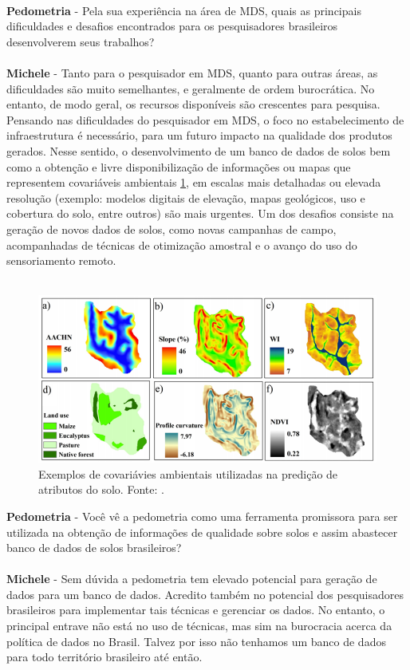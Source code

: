 \\
\textbf{Pedometria} - Pela sua experiência na área de MDS, quais as principais dificuldades e desafios encontrados para os pesquisadores brasileiros desenvolverem seus trabalhos?\\
\\
\textbf{Michele} - Tanto para o pesquisador em MDS, quanto para outras áreas, as dificuldades são muito semelhantes, e geralmente de ordem burocrática. No entanto, de modo geral, os recursos disponíveis são crescentes para pesquisa. Pensando nas dificuldades do pesquisador em MDS, o foco no estabelecimento de infraestrutura é necessário, para um futuro impacto na qualidade dos produtos gerados. Nesse sentido, o desenvolvimento de um banco de dados de solos bem como a obtenção e livre disponibilização de informações ou mapas que representem covariáveis ambientais \ref{figure:covar}, em escalas mais detalhadas ou elevada resolução (exemplo: modelos digitais de elevação, mapas geológicos, uso e cobertura do solo, entre outros) são mais urgentes. Um dos desafios consiste na geração de novos dados de solos, como novas campanhas de campo, acompanhadas de técnicas de otimização amostral e o avanço do uso do sensoriamento remoto.\\
\\
\begin{figure}[htbp]
\centering
\includegraphics[scale=0.8]{figuras/covariaveis-ambientais}
\caption{Exemplos de covariávies ambientais utilizadas na predição de atributos do solo. Fonte: \cite{Menezes:2011}.}
\label{figure:covar}
\end{figure}
\noindent \textbf{Pedometria} - Você vê a pedometria como uma ferramenta promissora para ser utilizada na obtenção de informações de qualidade sobre solos e assim abastecer banco de dados de solos brasileiros?\\
\\
\textbf{Michele} - Sem dúvida a pedometria tem elevado potencial para geração de dados para um banco de dados. Acredito também no potencial dos pesquisadores brasileiros para implementar tais técnicas e gerenciar os dados. No entanto, o principal entrave não está no uso de técnicas, mas sim na burocracia acerca da política de dados no Brasil. Talvez por isso não tenhamos um banco de dados para todo território brasileiro até então.\\
